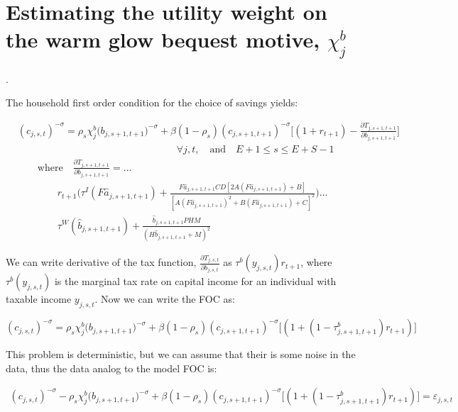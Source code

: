 \documentclass[letterpaper,12pt]{article}
\theoremstyle{definition}
\begin{document}
\section{Estimating the utility weight on the warm glow bequest motive, $\chi^{b}_{j}$}.

The household first order condition for the choice of savings yields:

    \begin{equation}\label{EqEulerSavGen}
      \begin{split}
        &(c_{j,s,t})^{-\sigma} = \rho_s\chi^b_j\bigl(b_{j,s+1,t+1}\bigr)^{-\sigma} + \beta(1-\rho_s)(c_{j,s+1,t+1})^{-\sigma}\Biggl[(1 + r_{t+1}) - \frac{\partial T_{j,s+1,t+1}}{\partial b_{j,s+1,t+1}}\Biggr] \\
        &\qquad\qquad\qquad\qquad\qquad\qquad\qquad\qquad\forall j,t,\quad\text{and}\quad E+1\leq s \leq E+S-1 \\
        &\qquad\text{where}\quad \frac{\partial T_{j,s+1,t+1}}{\partial b_{j,s+1,t+1}} = ...\\
        &\qquad\qquad r_{t+1}\Biggl(\tau^I(F\hat{a}_{j,s+1,t+1}) + \frac{F\hat{a}_{j,s+1,t+1}CD\left[2A(F\hat{a}_{j,s+1,t+1}) + B\right]}{\left[A(F\hat{a}_{j,s+1,t+1})^2 + B(F\hat{a}_{j,s+1,t+1}) + C\right]^2}\Biggr) ... \\
        &\qquad\qquad \tau^W(\hat{b}_{j,s+1,t+1}) + \frac{\hat{b}_{j,s+1,t+1}PHM}{\left(H\hat{b}_{j,s+1,t+1} + M\right)^2}
      \end{split}
    \end{equation}
    
    We can write derivative of the tax function, $ \frac{\partial T_{j,s,t}}{\partial b_{j,s,t}}$ as $\tau^{b}(y_{j,s,t})r_{t+1}$, where $\tau^{b}(y_{j,s,t})$ is the marginal tax rate on capital income for an individual with taxable income $y_{j,s,t}$.  Now we can write the FOC as:
    
            \begin{equation}\label{EqEulerLabGen}
        (c_{j,s,t})^{-\sigma} = \rho_s\chi^b_j\bigl(b_{j,s+1,t+1}\bigr)^{-\sigma} + \beta(1-\rho_s)(c_{j,s+1,t+1})^{-\sigma}\Biggl[(1 + (1-\tau^{b}_{j,s+1,t+1})r_{t+1}) \Biggr]
        \end{equation}
        
        This problem is deterministic, but we can assume that their is some noise in the data, thus the data analog to the model FOC is: 

  \begin{equation}\label{EqEulerLabGen}
      \begin{split}
         (c_{j,s,t})^{-\sigma} - \rho_s\chi^b_j\bigl(b_{j,s+1,t+1}\bigr)^{-\sigma} + \beta(1-\rho_s)(c_{j,s+1,t+1})^{-\sigma}\Biggl[(1 + (1-\tau^{b}_{j,s+1,t+1})r_{t+1}) \Biggr] = \varepsilon_{j,s,t}  
        \end{split}
        \end{equation}
\end{document}
